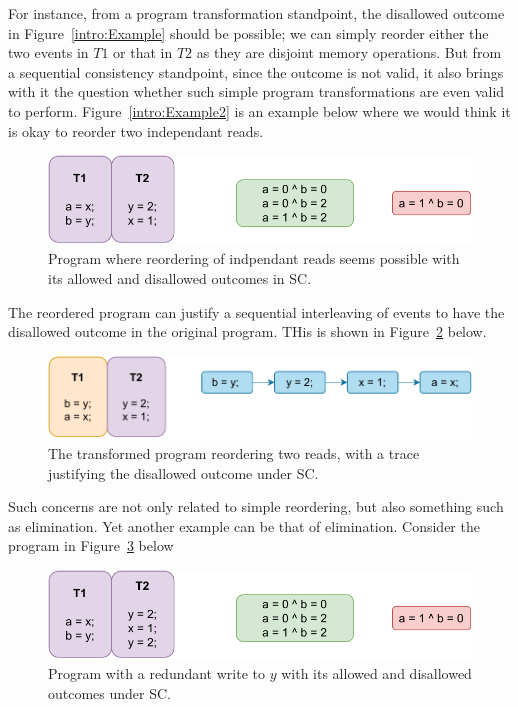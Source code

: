     For instance, from a program transformation standpoint, the disallowed outcome in Figure~\ref{intro:Example} should be possible; we can simply reorder either the two events in $T1$ or that in $T2$ as they are disjoint memory operations. 
    But from a sequential consistency standpoint, since the outcome is not valid, it also brings with it the question whether such simple program transformations are even valid to perform.
    Figure~\ref{intro:Example2} is an example below where we would think it is okay to reorder two independant reads. 
    \begin{figure}[H]
        \centering
        \includegraphics[scale=1]{2.Background/SC_Reordering(a).pdf}
        \caption{Program where reordering of indpendant reads seems possible with its allowed and disallowed outcomes in SC.}
        \label{intro:Example2(a)}
    \end{figure}

    The reordered program can justify a sequential interleaving of events to have the disallowed outcome in the original program. 
    THis is shown in Figure~\ref{intro:Example2(b)} below.

    \begin{figure}[H]
        \centering
        \includegraphics[scale=1]{2.Background/SC_Reordering(b).pdf}
        \caption{The transformed program reordering two reads, with a trace justifying the disallowed outcome under SC.}
        \label{intro:Example2(b)}
    \end{figure}

    Such concerns are not only related to simple reordering, but also something such as elimination. 
    Yet another example can be that of elimination. Consider the program in Figure~\ref{intro:Example3(a)} below
    \begin{figure}[H]
        \centering
        \includegraphics[scale=1]{2.Background/SC_Example2(a).pdf}
        \caption{Program with a redundant write to $y$ with its allowed and disallowed outcomes under SC.}
        \label{intro:Example3(a)}
    \end{figure}

